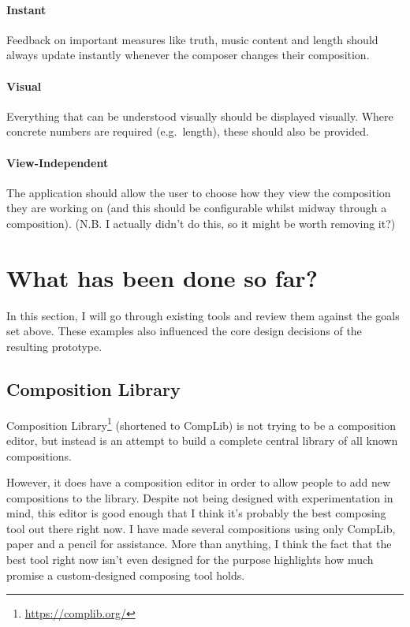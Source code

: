 \documentclass[12pt]{article}
\newcommand{\footurl}[1]{\footnote{\url{#1}}}
\begin{document}
\paragraph{Instant} Feedback on important measures like truth, music content and length should
always update instantly whenever the composer changes their composition.

\paragraph{Visual} Everything that can be understood visually should be displayed visually.  Where
concrete numbers are required (e.g.\ length), these should also be provided.

\paragraph{View-Independent} The application should allow the user to choose how they view the
composition they are working on (and this should be configurable whilst midway through a
composition).  (N.B. I actually didn't do this, so it might be worth removing it?)



\pagebreak

\section{What has been done so far?}

In this section, I will go through existing tools and review them against the goals set above.
These examples also influenced the core design decisions of the resulting prototype.

\subsection{Composition Library}

Composition Library\footurl{https://complib.org/} (shortened to CompLib) is not
trying to be a composition editor, but instead is an attempt to build a complete central library of
all known compositions.

However, it does have a composition editor in order to allow people to add new compositions to the
library.  Despite not being designed with experimentation in mind, this editor is good enough that
I think it's probably the best composing tool out there right now.  I have made several
compositions using only CompLib, paper and a pencil for assistance.  More than anything, I think the
fact that the best tool right now isn't even designed for the purpose highlights how much promise a
custom-designed composing tool holds.
\end{document}
